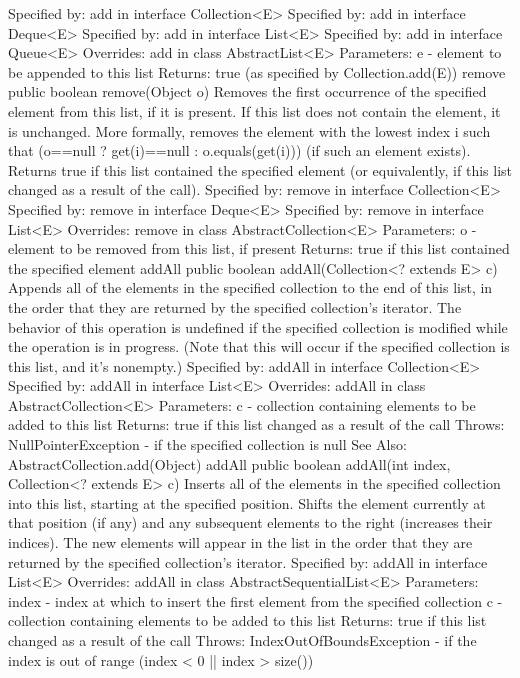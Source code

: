 \documentclass{book}
\begin{document}
Specified by:
add in interface Collection<E>
Specified by:
add in interface Deque<E>
Specified by:
add in interface List<E>
Specified by:
add in interface Queue<E>
Overrides:
add in class AbstractList<E>
Parameters:
e - element to be appended to this list
Returns:
true (as specified by Collection.add(E))
remove
public boolean remove(Object o)
Removes the first occurrence of the specified element from this list, if it is present. If this list does not contain the element, it is unchanged. More formally, removes the element with the lowest index i such that (o==null ? get(i)==null : o.equals(get(i))) (if such an element exists). Returns true if this list contained the specified element (or equivalently, if this list changed as a result of the call).
Specified by:
remove in interface Collection<E>
Specified by:
remove in interface Deque<E>
Specified by:
remove in interface List<E>
Overrides:
remove in class AbstractCollection<E>
Parameters:
o - element to be removed from this list, if present
Returns:
true if this list contained the specified element
addAll
public boolean addAll(Collection<? extends E> c)
Appends all of the elements in the specified collection to the end of this list, in the order that they are returned by the specified collection's iterator. The behavior of this operation is undefined if the specified collection is modified while the operation is in progress. (Note that this will occur if the specified collection is this list, and it's nonempty.)
Specified by:
addAll in interface Collection<E>
Specified by:
addAll in interface List<E>
Overrides:
addAll in class AbstractCollection<E>
Parameters:
c - collection containing elements to be added to this list
Returns:
true if this list changed as a result of the call
Throws:
NullPointerException - if the specified collection is null
See Also:
AbstractCollection.add(Object)
addAll
public boolean addAll(int index,
Collection<? extends E> c)
Inserts all of the elements in the specified collection into this list, starting at the specified position. Shifts the element currently at that position (if any) and any subsequent elements to the right (increases their indices). The new elements will appear in the list in the order that they are returned by the specified collection's iterator.
Specified by:
addAll in interface List<E>
Overrides:
addAll in class AbstractSequentialList<E>
Parameters:
index - index at which to insert the first element from the specified collection
c - collection containing elements to be added to this list
Returns:
true if this list changed as a result of the call
Throws:
IndexOutOfBoundsException - if the index is out of range (index < 0 || index > size())
\end{document}
